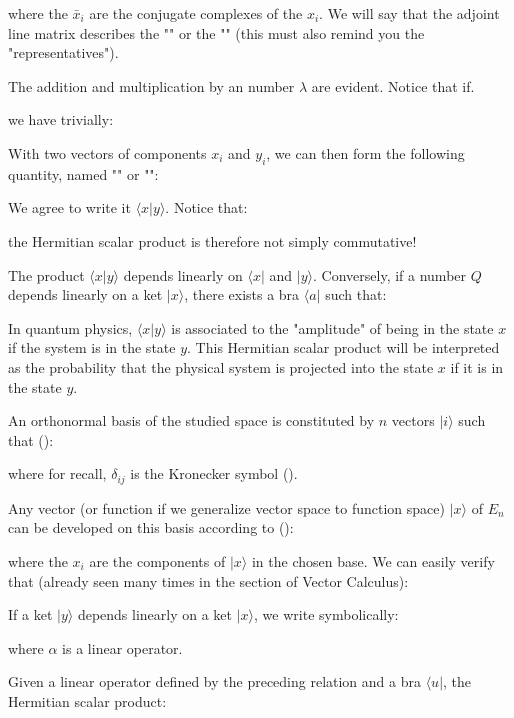 	where the $\bar{x}_i$ are the conjugate complexes of the $x_i$. We will say that the adjoint line matrix describes the "" or the "" (this must also remind you the "representatives").
	
		The addition and multiplication by an number $\lambda$ are evident. Notice that if.
	
	we have trivially:
	
	
	With two vectors of components $x_i$ and $y_i$, we can then form the following quantity, named "" or "":
	
	We agree to write it $\langle x | y \rangle$. Notice that:
	
	the Hermitian scalar product is therefore not simply commutative!
	
	The product $\langle x|y \rangle$ depends linearly on $\langle x |$ and $|y\rangle$. Conversely, if a number $Q$ depends linearly on a ket $|x\rangle$, there exists a bra $\langle a |$ such that:
	
	In quantum physics, $\langle x|y\rangle$ is associated to the "amplitude" of being in the state $x$ if the system is in the state $y$. This Hermitian scalar product will be interpreted as the probability that the physical system is projected into the state $x$ if it is in the state $y$.

	An orthonormal basis of the studied space is constituted by $n$ vectors $|i\rangle$ such that ():
	
	where for recall, $\delta_{ij}$ is the Kronecker symbol ().

Any vector (or function if we generalize vector space to function space) $|x\rangle$ of $E_n$ can be developed on this basis according to ():
	
	where the $x_i$ are the components of $|x\rangle$ in the chosen base. We can easily verify that (already seen many times in the section of Vector Calculus):
	
	If a ket $|y\rangle$ depends linearly on a ket $|x\rangle$, we write symbolically:
	
	where $\alpha$ is a linear operator. 

	Given a linear operator defined by the preceding relation and a bra $\langle u|$, the Hermitian scalar product:
	

